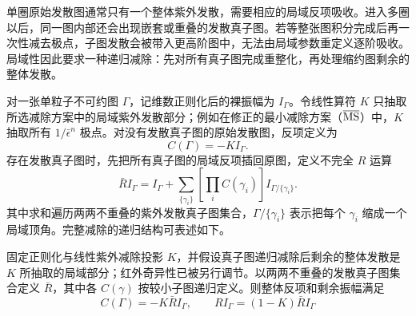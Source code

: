 单圈原始发散图通常只有一个整体紫外发散，需要相应的局域反项吸收。进入多圈以后，同一图内部还会出现嵌套或重叠的发散真子图。若等整张图积分完成后再一次性减去极点，子图发散会被带入更高阶图中，无法由局域参数重定义逐阶吸收。局域性因此要求一种递归减除：先对所有真子图完成重整化，再处理缩约图剩余的整体发散。

对一张单粒子不可约图 $\Gamma$，记维数正则化后的裸振幅为 $I_\Gamma$。令线性算符 $K$ 只抽取所选减除方案中的局域紫外发散部分；例如在修正的最小减除方案（$\overline{\rm MS}$）中，$K$ 抽取所有 $1/\bar\epsilon^n$ 极点。对没有发散真子图的原始发散图，反项定义为
\begin{equation*}
 C(\Gamma)=-K I_\Gamma.
\end{equation*}
存在发散真子图时，先把所有真子图的局域反项插回原图，定义不完全 $R$ 运算
\begin{equation}
 {
 \bar R I_\Gamma
 =I_\Gamma
 +\sum_{\{\gamma_i\}}
 \left[\prod_i C(\gamma_i)\right]
 I_{\Gamma/\{\gamma_i\}}.}
 \label{eq:rbar-operation-dp68}
\end{equation}
其中求和遍历两两不重叠的紫外发散真子图集合，$\Gamma/\{\gamma_i\}$ 表示把每个 $\gamma_i$ 缩成一个局域顶角。完整减除的递归结构可表述如下。
\begin{proposition}[局域反项的递归减除]
固定正则化与线性紫外减除投影 $K$，并假设真子图递归减除后剩余的整体发散是 $K$ 所抽取的局域部分；红外奇异性已被另行调节。以两两不重叠的发散真子图集合定义 $\bar R$，其中各 $C(\gamma)$ 按较小子图递归定义。则整体反项和剩余振幅满足
\begin{equation}
 {
 C(\Gamma)=-K\bar RI_\Gamma,
 \qquad
 RI_\Gamma=(1-K)\bar RI_\Gamma}
 \label{eq:r-operation-dp11}
\end{equation}
\end{proposition}
